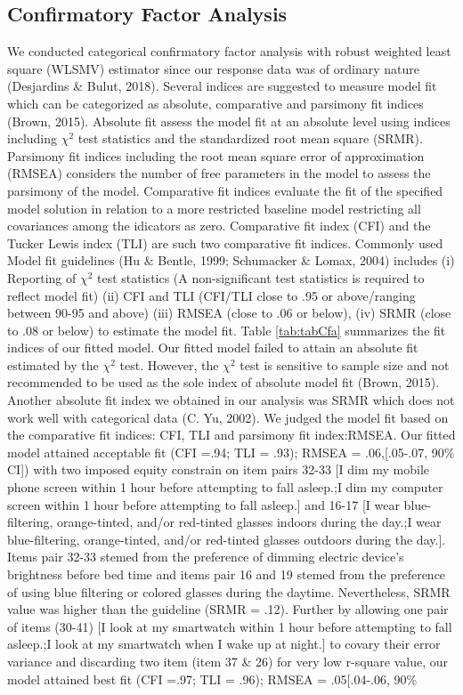 \documentclass[
  english,
  man]{apa6}
\begin{document}
\hypertarget{confirmatory-factor-analysis}{%
\subsection{Confirmatory Factor Analysis}\label{confirmatory-factor-analysis}}

We conducted categorical confirmatory factor analysis with robust weighted least square (WLSMV) estimator since our response data was of ordinary nature (Desjardins \& Bulut, 2018). Several indices are suggested to measure model fit which can be categorized as absolute, comparative and parsimony fit indices (Brown, 2015). Absolute fit assess the model fit at an absolute level using indices including \(\chi^2\) test statistics and the standardized root mean square (SRMR). Parsimony fit indices including the root mean square error of approximation (RMSEA) considers the number of free parameters in the model to assess the parsimony of the model. Comparative fit indices evaluate the fit of the specified model solution in relation to a more restricted baseline model restricting all covariances among the idicators as zero. Comparative fit index (CFI) and the Tucker Lewis index (TLI) are such two comparative fit indices. Commonly used Model fit guidelines (Hu \& Bentle, 1999; Schumacker \& Lomax, 2004) includes (i) Reporting of \(\chi^2\) test statistics (A non-significant test statistics is required to reflect model fit) (ii) CFI and TLI (CFI/TLI close to .95 or above/ranging between 90-95 and above) (iii) RMSEA (close to .06 or below), (iv) SRMR (close to .08 or below) to estimate the model fit. Table \ref{tab:tabCfa} summarizes the fit indices of our fitted model. Our fitted model failed to attain an absolute fit estimated by the \(\chi^2\) test. However, the \(\chi^2\) test is sensitive to sample size and not recommended to be used as the sole index of absolute model fit (Brown, 2015). Another absolute fit index we obtained in our analysis was SRMR which does not work well with categorical data (C. Yu, 2002). We judged the model fit based on the comparative fit indices: CFI, TLI and parsimony fit index:RMSEA. Our fitted model attained acceptable fit (CFI =.94; TLI = .93); RMSEA = .06,{[}.05-.07, 90\% CI{]}) with two imposed equity constrain on item pairs 32-33 {[}I dim my mobile phone screen within 1 hour before attempting to fall asleep.;I dim my computer screen within 1 hour before attempting to fall asleep.{]} and 16-17 {[}I wear blue-filtering, orange-tinted, and/or red-tinted glasses indoors during the day.;I wear blue-filtering, orange-tinted, and/or red-tinted glasses outdoors during the day.{]}. Items pair 32-33 stemed from the preference of dimming electric device's brightness before bed time and items pair 16 and 19 stemed from the preference of using blue filtering or colored glasses during the daytime. Nevertheless, SRMR value was higher than the guideline (SRMR = .12). Further by allowing one pair of items (30-41) {[}I look at my smartwatch within 1 hour before attempting to fall asleep.;I look at my smartwatch when I wake up at night.{]} to covary their error variance and discarding two item (item 37 \& 26) for very low r-square value, our model attained best fit (CFI =.97; TLI = .96); RMSEA = .05{[}.04-.06, 90\% 
\end{document}
